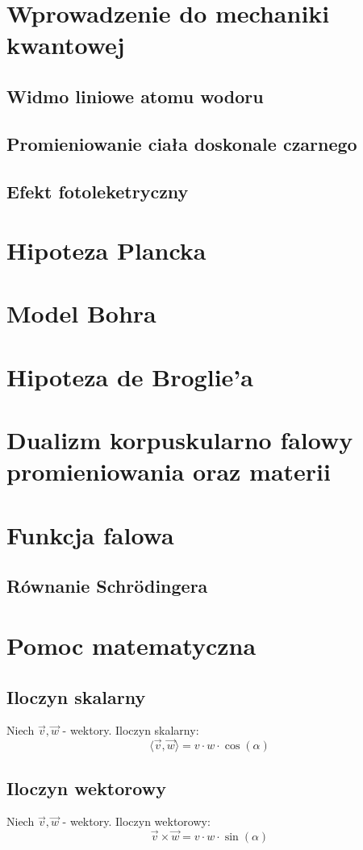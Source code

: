 \documentclass{article}
\theoremstyle{definition}
\theoremstyle{definition}
\theoremstyle{definition}
\theoremstyle{definition}
\begin{document}
\section{Wprowadzenie do mechaniki kwantowej}
\subsection{Widmo liniowe atomu wodoru}
\subsection{Promieniowanie ciała doskonale czarnego}
\subsection{Efekt fotoleketryczny}

\section{Hipoteza Plancka}

\section{Model Bohra}

\section{Hipoteza de Broglie'a}

\section{Dualizm korpuskularno falowy promieniowania oraz materii}

\section{Funkcja falowa}
\subsection{Równanie Schrödingera}

\section{Pomoc matematyczna}
\subsection{Iloczyn skalarny}
Niech \(\vec{v}, \vec{w}\) - wektory. Iloczyn skalarny:
\[
\langle \vec{v}, \vec{w} \rangle = v \cdot w \cdot \cos(\alpha)
\]

\subsection{Iloczyn wektorowy}
Niech \(\vec{v}, \vec{w}\) - wektory. Iloczyn wektorowy:
\[
\vec{v} \times \vec{w} = v \cdot w \cdot \sin(\alpha)
\]
\end{document}

